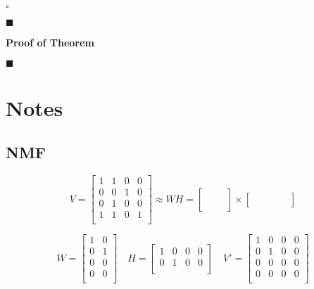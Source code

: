 \documentclass[oneside, final, 14pt]{extarticle}
\begin{document}
$\square$

$\blacksquare$

\textbf{Proof of Theorem}

$\blacksquare$

\section{Notes}

\subsection{NMF}

\[
  V =
  \begin{bmatrix}
    1 & 1 & 0 & 0 \\
    0 & 0 & 1 & 0 \\
    0 & 1 & 0 & 0 \\
    1 & 1 & 0 & 1 \\
  \end{bmatrix}
  \approx WH =
  \begin{bmatrix}
    & & \\
    & & \\
    & & \\
    & & \\
  \end{bmatrix}
  \times
  \begin{bmatrix}
    & & & & \\
    & & & & \\
  \end{bmatrix}
\]

\[
  W =
  \begin{bmatrix}
    1 & 0 \\
    0 & 1 \\
    0 & 0 \\
    0 & 0 \\
  \end{bmatrix} \quad
  H =
  \begin{bmatrix}
    1 & 0 & 0 & 0 \\
    0 & 1 & 0 & 0 \\
  \end{bmatrix} \quad
  V' =
  \begin{bmatrix}
    1 & 0 & 0 & 0 \\
    0 & 1 & 0 & 0 \\
    0 & 0 & 0 & 0 \\
    0 & 0 & 0 & 0 \\
  \end{bmatrix}
\]
\end{document}
